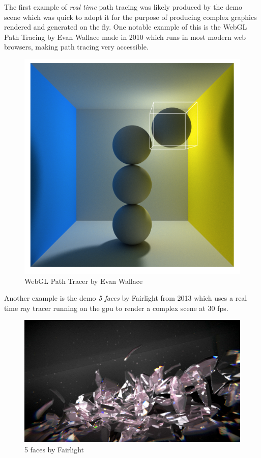 \documentclass[
  twoside,
  11pt, a4paper,
  footinclude=true,
  headinclude=true,
  cleardoublepage=empty
]{scrreprt}
\begin{document}
The first example of \emph{real time} path tracing was likely produced by the demo scene
\cite{wiki:demoscene} which was quick to adopt it \cite{site:realtime-radiosity-demos}
for the purpose of producing complex graphics rendered and generated on the fly. One notable
example of this is the WebGL Path Tracing by Evan Wallace made in 2010
\cite{site:webgl-path-tracing} which runs in most modern web browsers, making path tracing very
accessible.

\begin{figure}[H]
    \includegraphics[scale=0.4]{webgl-pathtracer}
    \centering
    \caption{WebGL Path Tracer by Evan Wallace}
    \label{fig:webgl-pathtracer}
\end{figure}

Another example is the demo \textit{5 faces} by Fairlight from 2013
\cite{wiki:5faces-fairlight} which
uses a real time ray tracer running on the \acs{gpu} to render a complex scene at 30 \acs{fps}.

\begin{figure}[H]
    \includegraphics[scale=0.5]{5faces}
    \centering
    \caption{5 faces by Fairlight}
    \label{fig:5faces}
\end{figure}
\end{document}
